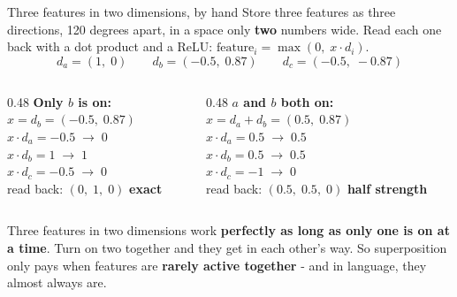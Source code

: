 \documentclass[aspectratio=169]{beamer}
\newcommand{\keybox}[1]{%
  \begin{tcolorbox}[colback=armblue!8, colframe=armblue, boxrule=0.6pt, arc=2pt]
  #1
  \end{tcolorbox}}
\begin{document}
\begin{frame}{Three features in two dimensions, by hand}
  Store three features as three directions, 120 degrees apart, in a space only \textbf{two}
  numbers wide. Read each one back with a dot product and a ReLU: $\text{feature}_i =
  \max(0,\; x \cdot d_i)$.
  \[
    d_a = (1,\; 0) \qquad d_b = (-0.5,\; 0.87) \qquad d_c = (-0.5,\; -0.87)
  \]
  \begin{columns}[T]
    \begin{column}{0.48\textwidth}
      \textbf{Only $b$ is on:}\\ $x = d_b = (-0.5,\; 0.87)$\\[0.3em]
      {\small
      $x \cdot d_a = -0.5 \;\rightarrow\; 0$\\
      $x \cdot d_b = 1 \;\rightarrow\; 1$\\
      $x \cdot d_c = -0.5 \;\rightarrow\; 0$\\[0.3em]
      read back: $(0,\; 1,\; 0)$ \textcolor{paramgreen}{\textbf{exact}}}
    \end{column}
    \begin{column}{0.48\textwidth}
      \textbf{$a$ and $b$ both on:}\\ $x = d_a + d_b = (0.5,\; 0.87)$\\[0.3em]
      {\small
      $x \cdot d_a = 0.5 \;\rightarrow\; 0.5$\\
      $x \cdot d_b = 0.5 \;\rightarrow\; 0.5$\\
      $x \cdot d_c = -1 \;\rightarrow\; 0$\\[0.3em]
      read back: $(0.5,\; 0.5,\; 0)$ \textcolor{armred}{\textbf{half strength}}}
    \end{column}
  \end{columns}

  \vspace{0.3em}
  \keybox{\small Three features in two dimensions work \textbf{perfectly as long as only one is on
  at a time}. Turn on two together and they get in each other's way. So superposition only pays
  when features are \textbf{rarely active together} - and in language, they almost always are.}
\end{frame}
\end{document}
